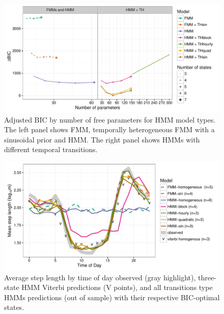 \documentclass{article}\usepackage[]{graphicx}\usepackage{xcolor}
\makeatletter
\def\maxwidth{ %
  \ifdim\Gin@nat@width>\linewidth
    \linewidth
  \else
    \Gin@nat@width
  \fi
}
\newenvironment{knitrout}{}{} %
\makeatother
\begin{document}
\clearpage

\begin{knitrout}
\color{fgcolor}\begin{figure}
\includegraphics[width=\maxwidth]{figure/adj_BIC_comparisons-1} \caption[Adjusted BIC by number of free parameters for HMM model types]{Adjusted BIC by number of free parameters for HMM model types. The left panel shows FMM, temporally heterogeneous FMM with a sinusoidal prior and HMM. The right panel shows HMMs with different temporal transitions.}\label{fig:adj_BIC_comparisons}
\end{figure}


\end{knitrout}

\clearpage

\begin{knitrout}
\color{fgcolor}\begin{figure}
\includegraphics[width=\maxwidth]{figure/avg_step_length_by_time-1} \caption[Average step length by time of day observed (gray highlight), three-state HMM Viterbi predictions (V points), and all transitions type HMMs predictions (out of sample) with their respective BIC-optimal states]{Average step length by time of day observed (gray highlight), three-state HMM Viterbi predictions (V points), and all transitions type HMMs predictions (out of sample) with their respective BIC-optimal states.}\label{fig:avg_step_length_by_time}
\end{figure}


\end{knitrout}
\end{document}

